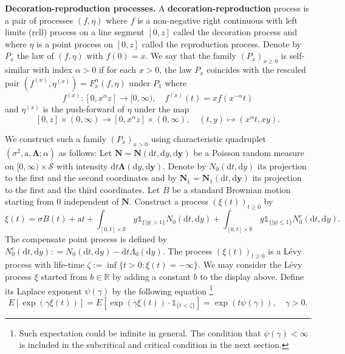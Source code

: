 \documentclass[12pt]{article}
\numberwithin{equation}{section}
\theoremstyle{plain}
\theoremstyle{definition}
\newcommand{\D}{\mathrm{d}}
\newcommand{\Bd}[1]{\boldsymbol{#1}}
\begin{document}
\bigskip

\noindent \textbf{Decoration-reproduction processes.} A \textbf{decoration-reproduction} process is a pair of processes $(f,\eta)$ where  $f$ is a non-negative right continuous with left limits (rcll) process on a line segment $[0, z]$ called the decoration process and where $\eta$ is a point process on $[0, z]$ called the reproduction process. Denote by $P_x$ the law of $(f, \eta)$ with $f(0) = x$.  We say that the family $(P_x)_{x\geq 0}$ is self-similar with index $\alpha>0$ if for each $x > 0$, the law  $P_x$ coincides with the rescaled pair $(f^{(x)},\eta^{(x)})= F^{\alpha}_x(f, \eta)$ under $P_1$ where
\begin{equation}\label{eq: scale f}
    f^{(x)}:[0, x^{\alpha}z]\to[0, \infty),\quad f^{(x)}(t) = xf(x^{-\alpha}t)
\end{equation}
\noindent and $\eta^{(x)}$ is the push-forward of $\eta$ under the map
\[
[0, z]\times(0, \infty)\to [0, x^{\alpha}z]\times(0,\infty), \quad (t, y)\mapsto (x^{\alpha}t, xy).
\]

We  construct such a family $(P_x)_{x>0}$ using characteristic quadruplet $(\sigma^2, \mathrm{a}, \boldsymbol{\Lambda}; \alpha)$ as follows: Let $\Bd{\mathbf{N}} = \Bd{\mathbf{N}}(\D t, \D y, \D \Bd y)$ be a Poisson random measure on $[0, \infty)\times \mathcal{S}$ with intensity $\D t\Bd\Lambda(\D y, \D \Bd y)$. Denote by $N_0(\D t, \D y)$ its projection to the first and the second coordinates and by  $\Bd{\mathbf{N}}_1 = \Bd{\mathbf{N}}_1(\D t, \D \Bd y)$ its projection to the first and the third coordinates. Let $B$ be a standard Brownian motion starting from $0$ independent of $\Bd{\mathbf{N}}$. Construct a process $(\xi(t))_{t\geq 0}$ by
\[\xi(t) = \sigma B(t) + \mathrm{a}t + \int_{[0, t]\times\mathbb{R}} y\mathds{1}_{\{|y|>1\}}N_0(\D t, \D y) + \int_{[0, t]\times \mathbb{R}} y\mathds{1}_{\{|y|\leq 1\}}N^c_0(\D t, \D y). \]
\noindent The compensate point process is defined by $N^{c}_0(\D t, \D y) : = N_0(\D t, \D y) - \D t \Lambda_0(\D y)$. The process $(\xi(t))_{t\geq 0}$ is a L\'evy process with life-time $\zeta := \inf\{t>0:\xi(t) = -\infty\}$. We may consider the L\'evy process $\xi$ started from $b\in \mathbb{R}$ by adding a constant $b$ to the display above. Define its Laplace exponent $\psi(\gamma)$ by the following equation \footnote{Such expectation could be infinite in general. The condition that $\psi(\gamma)<\infty$ is included in the subcritical and critical condition in the next section. }
\begin{equation}\label{eq: Laplace exponent}
E[\exp(\gamma \xi(t))] = E[\exp(\gamma \xi(t))\cdot\mathds{1}_{\{t<\zeta\}}]=\exp(t\psi(\gamma)), \quad \gamma>0.
\end{equation}
\end{document}
